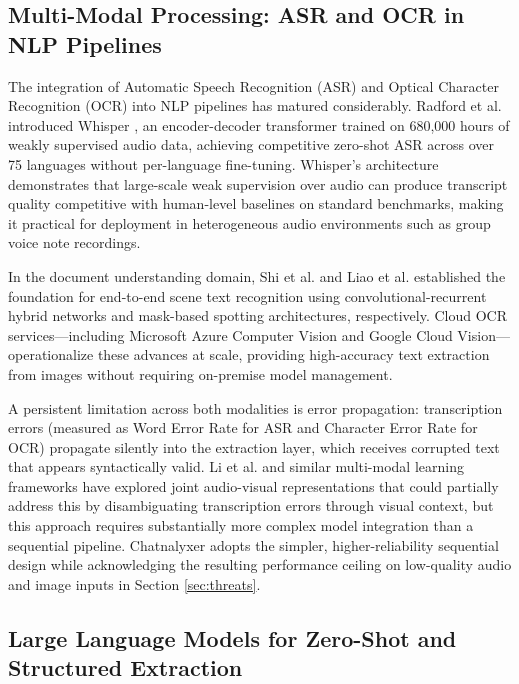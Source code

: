 \subsection{Multi-Modal Processing: ASR and OCR in NLP Pipelines}

The integration of Automatic Speech Recognition (ASR) and Optical Character Recognition (OCR) into NLP pipelines has matured considerably. Radford et al. introduced Whisper \cite{radford2022whisper}, an encoder-decoder transformer trained on 680,000 hours of weakly supervised audio data, achieving competitive zero-shot ASR across over 75 languages without per-language fine-tuning. Whisper's architecture demonstrates that large-scale weak supervision over audio can produce transcript quality competitive with human-level baselines on standard benchmarks, making it practical for deployment in heterogeneous audio environments such as group voice note recordings.

In the document understanding domain, Shi et al. \cite{shi2017crnn} and Liao et al. \cite{liao2020mask} established the foundation for end-to-end scene text recognition using convolutional-recurrent hybrid networks and mask-based spotting architectures, respectively. Cloud OCR services—including Microsoft Azure Computer Vision and Google Cloud Vision—operationalize these advances at scale, providing high-accuracy text extraction from images without requiring on-premise model management.

A persistent limitation across both modalities is error propagation: transcription errors (measured as Word Error Rate for ASR and Character Error Rate for OCR) propagate silently into the extraction layer, which receives corrupted text that appears syntactically valid. Li et al. \cite{li2023blip2} and similar multi-modal learning frameworks have explored joint audio-visual representations that could partially address this by disambiguating transcription errors through visual context, but this approach requires substantially more complex model integration than a sequential pipeline. Chatnalyxer adopts the simpler, higher-reliability sequential design while acknowledging the resulting performance ceiling on low-quality audio and image inputs in Section \ref{sec:threats}.

\subsection{Large Language Models for Zero-Shot and Structured Extraction}

